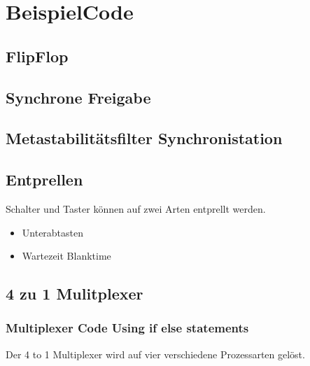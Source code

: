 \section{BeispielCode}
\subsection{FlipFlop}


\subsection{Synchrone Freigabe}


\subsection{Metastabilitätsfilter Synchronistation}


\subsection{Entprellen}
Schalter und Taster können auf zwei Arten entprellt werden.\\
\begin{itemize}
\item Unterabtasten
\item Wartezeit Blanktime
\end{itemize}


\subsection{4 zu 1 Mulitplexer}

\subsubsection{Multiplexer Code Using if else statements}
Der 4 to 1 Multiplexer wird auf vier verschiedene Prozessarten gelöst.

